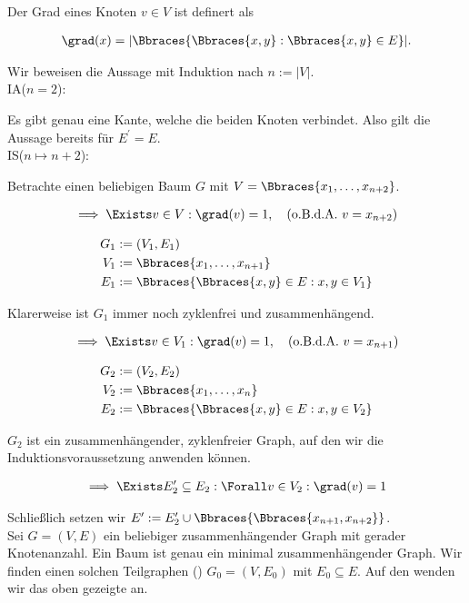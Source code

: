 \begin{solution}
Der Grad eines Knoten $v \in V$ ist definert als

\begin{align*}
  \grad(x)
  =
  |\Bbraces{\Bbraces{x, y}: \Bbraces{x, y} \in E}|.
\end{align*}

Wir beweisen die Aussage mit Induktion nach $n := |V|$. \\

IA($n = 2$):

Es gibt genau eine Kante, welche die beiden Knoten verbindet.
Also gilt die Aussage bereits für $E^\prime = E$. \\

IS($n \mapsto n + 2$):

Betrachte einen beliebigen Baum $G$ mit $V = \Bbraces{x_1, \dots, x_{n+2}}$.

\begin{align*}
  \implies
  \Exists v \in V:
  \grad(v) = 1,
  \quad
  \text{(o.B.d.A. $v = x_{n+2}$)}
\end{align*}

\begin{align*}
  G_1 & := (V_1, E_1) \\
  V_1 & := \Bbraces{x_1, \dots, x_{n+1}} \\
  E_1 & := \Bbraces{\Bbraces{x, y} \in E: x, y \in V_1}
\end{align*}

Klarerweise ist $G_1$ immer noch zyklenfrei und zusammenhängend.

\begin{align*}
  \implies
  \Exists v \in V_1:
  \grad(v) = 1,
  \quad
  \text{(o.B.d.A. $v = x_{n+1}$)}
\end{align*}

\begin{align*}
  G_2 & := (V_2, E_2) \\
  V_2 & := \Bbraces{x_1, \dots, x_{n}} \\
  E_2 & := \Bbraces{\Bbraces{x, y} \in E: x, y \in V_2}
\end{align*}

$G_2$ ist ein zusammenhängender, zyklenfreier Graph, auf den wir die Induktionsvoraussetzung anwenden können.

\begin{align*}
  \implies
  \Exists E_2^\prime \subseteq E_2:
  \Forall v \in V_2:
  \grad(v) = 1
\end{align*}

Schließlich setzen wir $E^\prime := E_2^\prime \cup \Bbraces{\Bbraces{x_{n+1}, x_{n+2}}}$. \\

Sei $G = (V, E)$ ein beliebiger zusammenhängender Graph mit gerader Knotenanzahl.
Ein Baum ist genau ein minimal zusammenhängender Graph.
Wir finden einen solchen Teilgraphen () $G_0 = (V, E_0)$ mit $E_0 \subseteq E$.
Auf den wenden wir das oben gezeigte an. \\

\end{solution}

